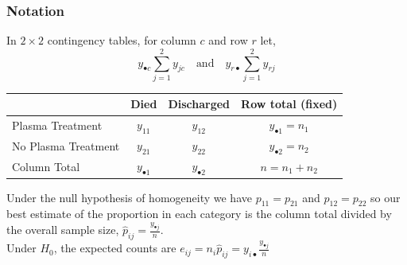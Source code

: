 \documentclass[a4paper]{article}
\begin{document}
\subsubsection{Notation}
In \( 2 \times 2 \) contingency tables, for column \( c \) and row \( r \) let,
\[
	y_{\bullet c} \sum_{j=1}^{2} y_{jc} \quad\text{and}\quad y_{r \bullet} \sum_{j=1}^{2} y_{rj}
\]
\begin{table}[H]
	\centering
	\begin{tabular}{@{}lccc@{}}
	\toprule
						& Died                & Discharged          & Row total (fixed)         \\ \midrule
	Plasma Treatment    & \( y_{11} \)        & \( y_{12} \)        & \( y_{\bullet 1} = n_1 \) \\
	No Plasma Treatment & \( y_{21} \)        & \( y_{22} \)        & \( y_{\bullet 2} = n_2 \) \\ \midrule
	Column Total        & \( y_{\bullet 1} \) & \( y_{\bullet 2} \) & \( n = n_1 + n_2 \)       \\ \bottomrule
	\end{tabular}
\end{table}
Under the null hypothesis of homogeneity we have  \( p_{11} = p_{21} \) and \( p_{12} = p_{22} \)  so our best estimate of the proportion in each category is the column total divided by the overall sample size, \( \hat{p}_{ij} = \frac{y_{\bullet j}}{n} \).\\
Under \( H_0 \), the expected counts are \( e_{ij} = n_i \hat{p}_{ij} = y_{i \bullet} \frac{y_{\bullet j}}{n} \) 
\end{document}
